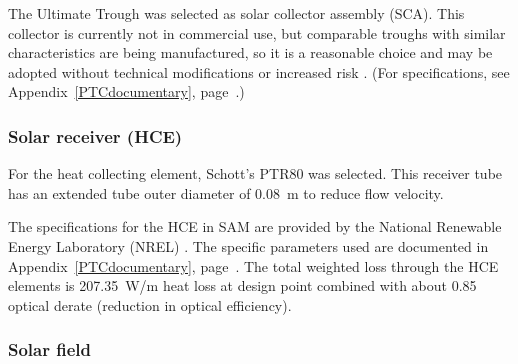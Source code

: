 The Ultimate Trough was selected as solar collector assembly (SCA). This collector is currently not in commercial use, but comparable troughs with similar characteristics are being manufactured, so it is a reasonable choice and may be adopted without technical modifications or increased risk \cite{Riffelmann2014}. (For specifications, see Appendix~\ref{PTCdocumentary}, page~\pageref{PTC_Ultimate_config}.)


\subsubsection{Solar receiver (HCE)}
For the heat collecting element, Schott's PTR80 was selected. This receiver tube has an extended tube outer diameter of \SI{0.08}{m} to reduce flow velocity.


The specifications for the HCE in SAM are provided by the National Renewable Energy Laboratory (NREL) \cite{Kutscher2012}. The specific parameters used are documented in Appendix~\ref{PTCdocumentary}, page~\pageref{PTC_HCE}. The total weighted loss through the HCE elements is \SI{207.35}{W/m} heat loss at design point combined with about 0.85 optical derate (reduction in optical efficiency).


\subsubsection{Solar field}

